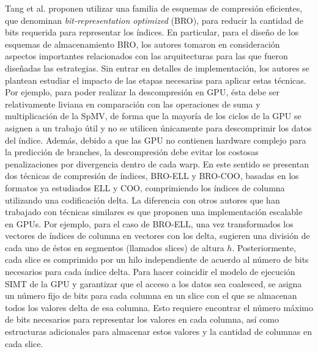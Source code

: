 Tang et al. \cite{Tang2013} proponen utilizar una familia de esquemas de compresión eficientes, que denominan  \textit{bit-representation optimized} (BRO), para reducir la cantidad de bits requerida para representar los índices. 
En particular, para el diseño de los esquemas de almacenamiento BRO, los autores tomaron en consideración aspectos importantes relacionados con las arquitecturas para las que fueron diseñadas las estrategias. Sin entrar en detalles de implementación, los autores se plantean estudiar el impacto de las etapas necesarias para aplicar estas técnicas. Por ejemplo, para poder realizar la descompresión en GPU, ésta debe ser relativamente liviana en comparación con las operaciones de suma  y multiplicación de la SpMV, de forma que la mayoría de los ciclos de la GPU se asignen a un trabajo útil y no se utilicen únicamente para descomprimir los datos del índice. Además, debido a que las GPU no contienen hardware complejo para la predicción de branches, la descompresión debe evitar los costosas penalizaciones por divergencia dentro de cada warp. 
En este sentido se presentan dos técnicas de compresión de índices, BRO-ELL y BRO-COO, basadas en los formatos ya estudiados ELL y COO, comprimiendo los índices de columna utilizando una codificación delta. La diferencia con otros autores que han trabajado con técnicas similares es que proponen una implementación escalable en GPUs. Por ejemplo, para el caso de BRO-ELL, una vez transformados los vectores de índices de columna en vectores con los delta, sugieren una división de cada uno de éstos en segmentos (llamados slices) de altura $h$. Posteriormente, cada slice es comprimido por un hilo independiente %
de acuerdo al número de bits necesarios para cada índice delta. Para hacer coincidir el modelo de ejecución SIMT de la GPU y garantizar que el acceso a los datos sea coalesced, se asigna un número fijo de bits para cada columna en un slice con el que se almacenan todos los valores delta de esa columna. Esto requiere encontrar el número máximo de bits necesarios para representar los valores en cada columna, así como estructuras adicionales para almacenar estos valores y la cantidad de columnas en cada slice.


